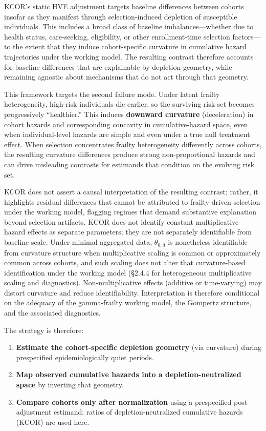 \documentclass[
]{article}
\newcounter{none} %
\providecommand{\tightlist}{%
  \setlength{\itemsep}{0pt}\setlength{\parskip}{0pt}}
\begin{document}
KCOR's static HVE adjustment targets baseline differences between
cohorts insofar as they manifest through selection-induced depletion of
susceptible individuals. This includes a broad class of baseline
imbalances---whether due to health status, care-seeking, eligibility, or
other enrollment-time selection factors---to the extent that they induce
cohort-specific curvature in cumulative hazard trajectories under the
working model. The resulting contrast therefore accounts for baseline
differences that are explainable by depletion geometry, while remaining
agnostic about mechanisms that do not act through that geometry.

This framework targets the second failure mode. Under latent frailty
heterogeneity, high-risk individuals die earlier, so the surviving risk
set becomes progressively ``healthier.'' This induces \textbf{downward
curvature} (deceleration) in cohort hazards and corresponding concavity
in cumulative-hazard space, even when individual-level hazards are
simple and even under a true null treatment effect. When selection
concentrates frailty heterogeneity differently across cohorts, the
resulting curvature differences produce strong non-proportional hazards
and can drive misleading contrasts for estimands that condition on the
evolving risk set.

KCOR does not assert a causal interpretation of the resulting contrast;
rather, it highlights residual differences that cannot be attributed to
frailty-driven selection under the working model, flagging regimes that
demand substantive explanation beyond selection artifacts. KCOR does not
identify constant multiplicative hazard effects as separate parameters;
they are not separately identifiable from baseline scale. Under minimal
aggregated data, \(\theta_{0,d}\) is nonetheless identifiable from
curvature structure when multiplicative scaling is common or
approximately common across cohorts, and such scaling does not alter
that curvature-based identification under the working model (§2.4.4 for
heterogeneous multiplicative scaling and diagnostics).
Non-multiplicative effects (additive or time-varying) may distort
curvature and reduce identifiability. Interpretation is therefore
conditional on the adequacy of the gamma-frailty working model, the
Gompertz structure, and the associated diagnostics.

The strategy is therefore:

\begin{enumerate}
\def\labelenumi{\arabic{enumi}.}
\tightlist
\item
  \textbf{Estimate the cohort-specific depletion geometry} (via
  curvature) during prespecified epidemiologically quiet periods.
\item
  \textbf{Map observed cumulative hazards into a depletion-neutralized
  space} by inverting that geometry.
\item
  \textbf{Compare cohorts only after normalization} using a prespecified
  post-adjustment estimand; ratios of depletion-neutralized cumulative
  hazards (KCOR) are used here.
\end{enumerate}
\end{document}
